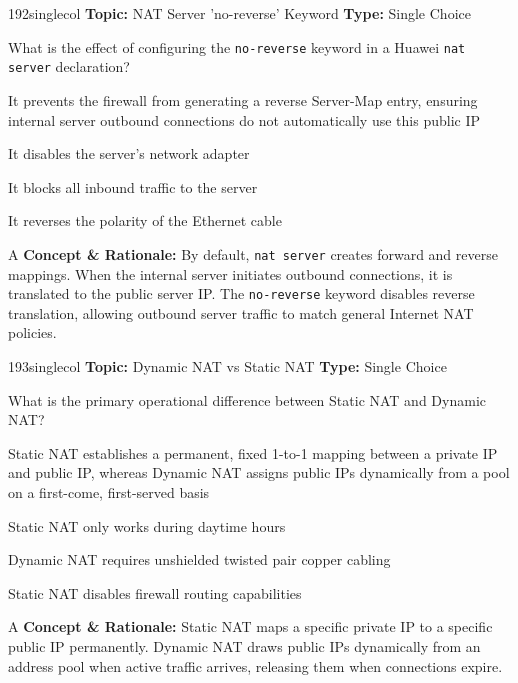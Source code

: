 \begin{qcard}{192}{singlecol}
\textcolor{darkslate!75}{\small\textbf{Topic:} NAT Server 'no-reverse' Keyword \hfill \textbf{Type:} Single Choice}\vspace{0.4em}\par
What is the effect of configuring the \texttt{no-reverse} keyword in a Huawei \texttt{nat server} declaration?
\begin{qoptions}
\item It prevents the firewall from generating a reverse Server-Map entry, ensuring internal server outbound connections do not automatically use this public IP
\item It disables the server's network adapter
\item It blocks all inbound traffic to the server
\item It reverses the polarity of the Ethernet cable
\end{qoptions}
\end{qcard}
\nopagebreak
\begin{explainbox}{A}
\textbf{Concept \& Rationale:} By default, \texttt{nat server} creates forward and reverse mappings. When the internal server initiates outbound connections, it is translated to the public server IP. The \texttt{no-reverse} keyword disables reverse translation, allowing outbound server traffic to match general Internet NAT policies.
\end{explainbox}

\begin{qcard}{193}{singlecol}
\textcolor{darkslate!75}{\small\textbf{Topic:} Dynamic NAT vs Static NAT \hfill \textbf{Type:} Single Choice}\vspace{0.4em}\par
What is the primary operational difference between Static NAT and Dynamic NAT?
\begin{qoptions}
\item Static NAT establishes a permanent, fixed 1-to-1 mapping between a private IP and public IP, whereas Dynamic NAT assigns public IPs dynamically from a pool on a first-come, first-served basis
\item Static NAT only works during daytime hours
\item Dynamic NAT requires unshielded twisted pair copper cabling
\item Static NAT disables firewall routing capabilities
\end{qoptions}
\end{qcard}
\nopagebreak
\begin{explainbox}{A}
\textbf{Concept \& Rationale:} Static NAT maps a specific private IP to a specific public IP permanently. Dynamic NAT draws public IPs dynamically from an address pool when active traffic arrives, releasing them when connections expire.
\end{explainbox}

